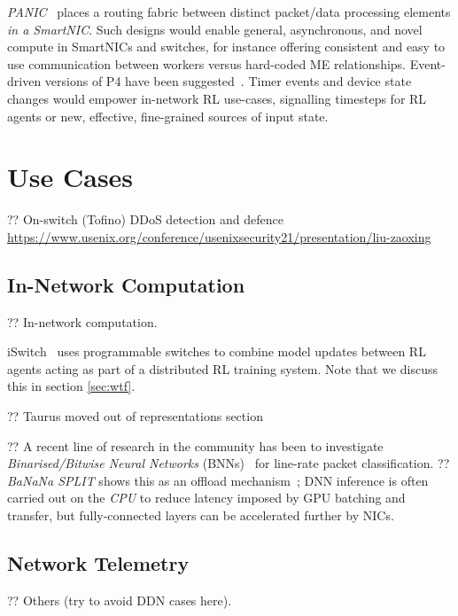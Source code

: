 \emph{PANIC}~\parencite{DBLP:conf/hotnets/StephensAS18} places a routing fabric between distinct packet/data processing elements \emph{in a SmartNIC}.
Such designs would enable general, asynchronous, and novel compute in SmartNICs and switches, for instance offering consistent and easy to use communication between workers versus hard-coded ME relationships.
Event-driven versions of P4 have been suggested~\parencite{DBLP:conf/hotnets/IbanezABM19}.
Timer events and device state changes would empower in-network RL use-cases, signalling timesteps for RL agents or new, effective, fine-grained sources of input state.

\section{Use Cases}

?? On-switch (Tofino) DDoS detection and defence \url{https://www.usenix.org/conference/usenixsecurity21/presentation/liu-zaoxing}

\subsection{In-Network Computation}\label{sec:in-network-computation}
?? In-network computation.

iSwitch~\cite{DBLP:conf/isca/LiLYCSH19} uses programmable switches to combine model updates between RL agents acting as part of a distributed RL training system.
Note that we discuss this in section \ref{sec:wtf}.

?? Taurus moved out of representations section~\parencite{DBLP:journals/corr/abs-2002-08987}

?? A recent line of research in the community has been to investigate \emph{Binarised/Bitwise Neural Networks} (BNNs)~\parencite{DBLP:conf/nips/HubaraCSEB16,DBLP:journals/corr/KimS16,DBLP:journals/corr/MiyashitaLM16} for line-rate packet classification.
?? \emph{BaNaNa SPLIT} shows this as an offload mechanism~\parencite{DBLP:conf/sigcomm/SanvitoSB18,DBLP:journals/corr/abs-1801-05731}; DNN inference is often carried out on the \emph{CPU} to reduce latency imposed by GPU batching and transfer, but fully-connected layers can be accelerated further by NICs.

\subsection{Network Telemetry}
?? Others (try to avoid DDN cases here).

